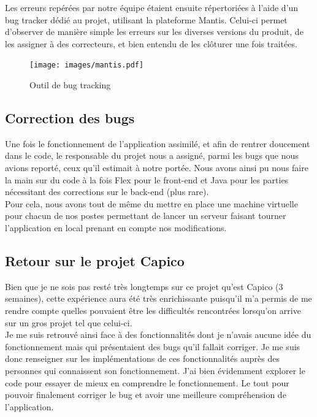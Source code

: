 Les erreurs repérées par notre équipe étaient ensuite répertoriées à l'aide d'un bug tracker dédié au projet, utilisant la plateforme Mantis. Celui-ci permet d'observer de manière simple les erreurs sur les diverses versions du produit, de les assigner à des correcteurs, et bien entendu de les clôturer une fois traitées.

\begin{figure}[H]
	\centering
	\texttt{[image: images/mantis.pdf]}
	\caption{Outil de bug tracking}
\end{figure}

\subsection{Correction des bugs}

Une fois le fonctionnement de l'application assimilé, et afin de rentrer \flqq{}doucement\frqq{} dans le code, le responsable du projet nous a assigné, parmi les bugs que nous avions reporté, ceux qu'il estimait à notre portée. Nous avons ainsi pu nous faire la main sur du code à la fois Flex pour le front-end et Java pour les parties nécessitant des corrections sur le back-end (plus rare).\\

Pour cela, nous avons tout de même du mettre en place une machine virtuelle pour chacun de nos postes permettant de lancer un serveur faisant tourner l'application \capico{} en local prenant en compte nos modifications.

\subsection{Retour sur le projet Capico}

Bien que je ne sois pas resté très longtemps sur ce projet qu'est Capico (3 semaines), cette expérience aura été très enrichissante puisqu'il m'a permis de me rendre compte quelles pouvaient être les difficultés rencontrées lorsqu'on arrive sur un gros projet tel que celui-ci.\\

Je me suis retrouvé ainsi face à des fonctionnalités dont je n'avais aucune idée du fonctionnement mais qui présentaient des bugs qu'il fallait corriger. Je me suis donc renseigner sur les implémentations de ces fonctionnalités auprès des personnes qui connaissent son fonctionnement. J'ai bien évidemment explorer le code pour essayer de mieux en comprendre le fonctionnement. Le tout pour pouvoir finalement corriger le bug et avoir une meilleure compréhension de l'application.